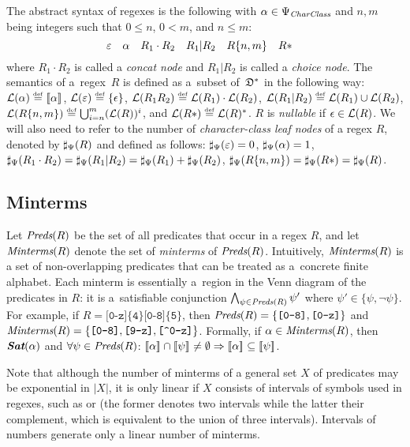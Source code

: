 \documentclass[acmsmall,screen]{acmart}
\begin{document}
The abstract syntax of regexes is the following with $\alpha\in
\Psi_{\textit{CharClass}}$ 
and $n, m$ being integers such that $0\leq n$, $0<m$, and $n\leq m$:
\[
\varepsilon\quad \alpha \quad
R_1\cdot R_2\quad
    R_1 | R_2\quad
    R\{n,m\}\quad
    R{*}\quad
    \]
where $R_1\cdot R_2$ is called a \emph{concat node} and $R_1 | R_2$ is called a \emph{choice node}.
%
The semantics of a~regex~$R$ is defined as a~subset of~$\mathfrak{D}^*$ in the
following way: 
%
$\langof{\pred{\alpha}} \eqdef
\den{\alpha}$, $\langof{\emp} \eqdef \{\eps\}$, $\langof{
  R_1R_2} \eqdef \langof{R_1}\concat\langof{R_2}$, $\langof{ R_1 |
  R_2} \eqdef \langof{ R_1}\cup \langof{R_2}$, $\langof{R\{n,m\}}
\eqdef \bigcup_{i=n}^m(\langof{R})^i$, and $\langof{R{*}} \eqdef
\langof{R}^*$.  $R$ is \emph{nullable} if $\epsilon
\in \mathcal{L}(R)$.
%
We will also need to refer to the number of \emph{character-class leaf nodes} of
a regex $R$, denoted by $\sharp_{\Psi}(R)$ and defined as follows:
$\sharp_{\Psi}(\varepsilon)=0$, $\sharp_{\Psi}(\alpha)=1$, $\sharp_{\Psi}(R_1\cdot R_2) =
\sharp_{\Psi}(R_1 | R_2) = \sharp_{\Psi}(R_1)+\sharp_{\Psi}(R_2)$,
$\sharp_{\Psi}(R\{n,m\})=\sharp_{\Psi}(R{*})=\sharp_{\Psi}(R)$. 


\subsection{Minterms}

Let $\textit{Preds}(R)$ be the set of all predicates that occur in a regex $R$, and let
$\textit{Minterms}(R)$ denote the set of \emph{minterms} of $\textit{Preds}(R)$.
%
Intuitively, $\textit{Minterms}(R)$ is a set of non-overlapping predicates that can be treated as
a~concrete finite alphabet.
%
Each minterm is essentially a~region in the Venn diagram of the predicates in $R$:
it is a~satisfiable conjunction $\bigwedge_{\psi\in \textit{Preds}(R)} \psi'$ where $\psi'\in\{\psi,\neg \psi\}$. 
%
For example, if $R = \texttt{[0-z]\{4\}[0-8]\{5\}}$, then $\textit{Preds}(R) =
\{\texttt{[0-8]},\texttt{[0-z]}\}$ and $\Minterms{R} =
\{\texttt{[0-8]},\texttt{[9-z]},\texttt{[{\caret}0-z]}\}$.
Formally, if $\alpha\in\textit{Minterms}(R)$, then $\textit{\textbf{Sat}}(\alpha)$ and $\forall \psi\in\textit{Preds}(R)$:
$\den{\alpha} \cap \den{\psi} \neq \emptyset \Rightarrow
\den{\alpha} \subseteq \den{\psi}$.


Note that although the number of minterms of a general set $X$ of predicates may be exponential in $|X|$, 
it is only linear if $X$ consists of intervals of symbols used in regexes,
such as \regex{[a-zA-Z]} or \regex{[\string^a-zA-Z]} (the former denotes two
intervals while the latter their complement, which is equivalent
to the union of three intervals). 
Intervals of numbers generate only a linear number of minterms. 
\end{document}
